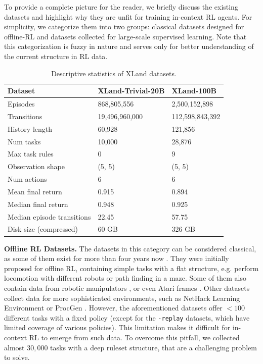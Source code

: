 \documentclass{article}
\begin{document}
To provide a complete picture for the reader, we briefly discuss the existing datasets and highlight why they are unfit for training in-context RL agents. For simplicity, we categorize them into two groups: classical datasets designed for offline-RL and datasets collected for large-scale supervised learning. Note that this categorization is fuzzy in nature and serves only for better understanding of the current structure in RL data.
\begin{table}[t]
\centering
\caption{Descriptive statistics of XLand datasets.}
\label{table:data-stats}
\begin{tabular}{@{}lll@{}}
\toprule
\textbf{Dataset}                & \textbf{XLand-Trivial-20B} & \textbf{XLand-100B} \\
\midrule
Episodes                        & 868,805,556       & 2,500,152,898 \\
Transitions                     & 19,496,960,000    & 112,598,843,392 \\
History length                  & 60,928            & 121,856 \\
Num tasks                       & 10,000            & 28,876 \\
Max task rules                  & 0                 & 9 \\
Observation shape               & (5, 5)            & (5, 5) \\
Num actions                     & 6                 & 6 \\
\midrule
Mean final return  & 0.915 & 0.894 \\
Median final return  & 0.948 & 0.925 \\
Median episode transitions  & 22.45 & 57.75 \\
\midrule
Disk size (compressed)          & 60 GB             & 326 GB \\
\bottomrule
\end{tabular}
\vskip -0.1in
\end{table}
\textbf{Offline RL Datasets.}
The datasets in this category can be considered classical, as some of them exist for more than four years now \citep{fu2020d4rl}. They were initially proposed for offline RL, containing simple tasks with a flat structure, e.g. perform locomotion with different robots \citep{lu2023challenges} or path finding in a maze. Some of them also contain data from robotic manipulators \citep{fu2020d4rl, rafailov2023d5rl}, or even Atari frames \citep{gulcehre2021rl}. Other datasets collect data for more sophisticated environments, such as NetHack Learning Environment \citep{hambro2023dungeons, kurenkov2024katakomba} or ProcGen \citep{cobbe2019procgen, mediratta2024generalization}. However, the aforementioned datasets offer $<100$ different tasks with a fixed policy (except for the \texttt{-replay} datasets, which have limited coverage of various policies). This limitation makes it difficult for in-context RL to emerge from such data. To overcome this pitfall, we collected almost $30,000$ tasks with a deep ruleset structure, that are a challenging problem to solve.
\end{document}
